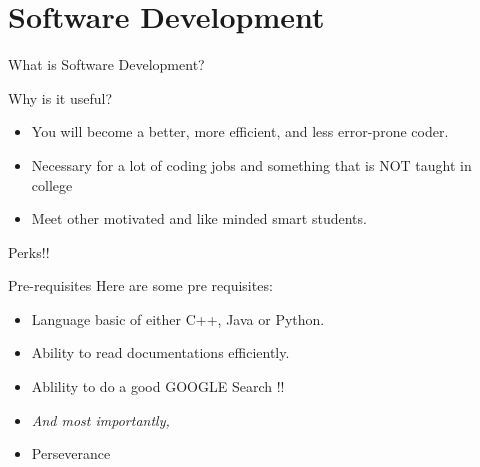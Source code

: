 \section{Software Development}
    \begin{frame}{What is Software Development?}
        
    \end{frame}
    \begin{frame}{Why is it useful?}
        \begin{itemize}
            \item<+-> You will become a better, more efficient, and less error-prone coder.
            \item<+-> Necessary for a lot of coding jobs and something that is NOT taught in college            
            \item<+-> Meet other motivated and like minded smart students.
        \end{itemize}
    \end{frame}
    \begin{frame}{Perks!!}
        \vspace{20px}
        \vspace{20px}        
        
    \end{frame}
    \begin{frame}{Pre-requisites}
        Here are some pre requisites:
        \pause
        \begin{itemize}
            \item<+-> Language basic of either C++, Java or Python.
            \item<+-> Ability to read documentations efficiently.
            \item<+-> Ablility to do a good GOOGLE Search !!            
            \item<+->[] \textit{And most importantly,}
            \item<+-> Perseverance
        \end{itemize}
    \end{frame}
